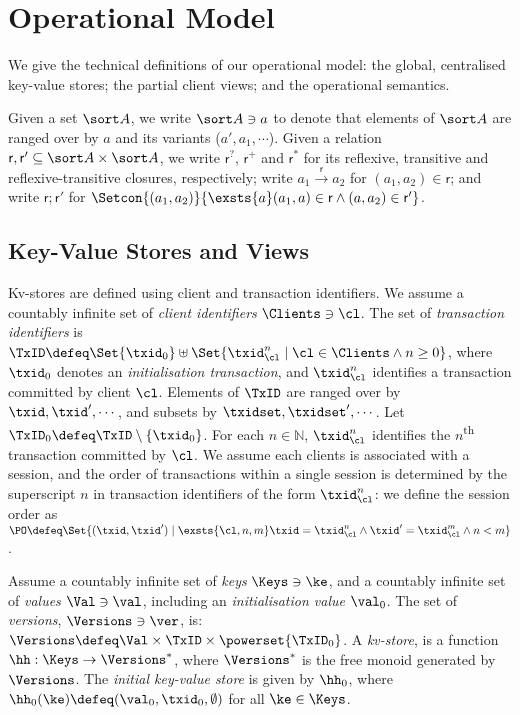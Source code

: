 \section{Operational Model}
\label{sec:model}

We give the technical definitions of our operational model: 
the global, centralised key-value stores; the partial client views;  and the
operational semantics. 

Given a set $\sort A$, we write $\sort A \ni a$ to denote that elements of $\sort A$ are ranged over by $a$ and its variants (\eg $a', a_1, \cdots$). 
Given a relation $\mathsf r, \mathsf r' \subseteq \sort A \times \sort A$,
we write $\mathsf r^?$, $\mathsf r^+$ and $\mathsf r^*$ for its reflexive, transitive and reflexive-transitive closures, respectively;
write $a_1 \xrightarrow{\mathsf r} a_2$ for $(a_1, a_2) \in \mathsf r$;
and write \( \mathsf r ; \mathsf r'\) for \( \Setcon{(a_1,a_2)}{\exsts{a} (a_1,a) \in \mathsf r \land (a,a_2) \in \mathsf r'}\).
\subsection{Key-Value Stores and Views}
\label{subsec:kvstores}
\label{sec:mkvs-view}
Kv-stores are defined using client and transaction identifiers.
We assume a countably infinite set of \emph{client identifiers} $\Clients \ni \cl$. 
The set of \emph{transaction identifiers} is  
$\TxID \defeq  \Set{\txid_{0}} \uplus \Set{ \txid_{\cl}^{n} \mid \cl
  \in \Clients \wedge n \geq 0 }$, 
where  $\txid_0$ denotes  an \emph{initialisation transaction}, 
and $\txid_{\cl}^{n}$ identifies a transaction committed by client $\cl$. 
Elements of $\TxID$ are ranged over by
$\txid, \txid', \cdots$, and subsets by $\txidset, \txidset', \cdots$. 
Let $\TxID_{0} \defeq \TxID \setminus \{ \txid_0\}$. 
For each $n \in \mathbb{N}$, $\txid_{\cl}^{n}$ identifies the $n$\textsuperscript{th} transaction  committed by $\cl$.
We assume each clients is associated with a session, 
and the order of transactions within a single session is determined by the superscript 
$n$ in transaction identifiers of the form $\txid_{\cl}^{n}$: we define the session order 
as 
$\PO \defeq \Set{ (\txid, \txid') \mid \exsts{ \cl, n,m } \txid =
  \txid_{\cl}^{n} \wedge \txid' = \txid_{\cl}^{m} \wedge n < m}$.

\begin{definition}[Kv-stores]
\label{def:his_heap}
\label{def:mkvs}
Assume a countably infinite set of \emph{keys} $\Keys \ni \ke$, 
and a countably infinite set of  \emph{values} $\Val \ni \val$, 
including an \emph{initialisation value} $\val_0 $.
The set of \emph{versions}, $\Versions \ni \ver$, is: $\Versions \defeq \Val \times \TxID \times \powerset{\TxID_{0}}$. 
A \emph{kv-store}, 
is a function $\hh: \Keys \rightarrow \Versions^{\ast}$, 
where $\Versions^{\ast}$ is the free monoid generated by $\Versions$. 
The \emph{initial key-value store} is given by $\hh_0$, where 
$\hh_{0}(\ke)\defeq  (\val_0, \txid_0, \emptyset)$ for
all $\ke \in \Keys$.
\end{definition}

